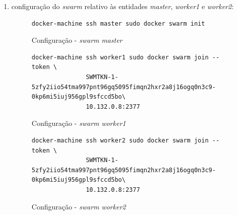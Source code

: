 \documentclass[a4paper]{report}
\begin{document}
{\begin{enumerate}[label=\textbf{\arabic*.}]
            \item configuração do \textit{swarm} relativo às entidades \textsl{master}, \textsl{worker1} e \textsl{worker2}:
            \begin{figure}[H]
                \centering
                \begin{verbatim}
docker-machine ssh master sudo docker swarm init
                \end{verbatim}
                \caption{Configuração - \textit{swarm} \textsl{master}}
                \label{fig:4}
            \end{figure}

            \begin{figure}[H]
                \centering
                \begin{verbatim}
docker-machine ssh worker1 sudo docker swarm join --token \
               SWMTKN-1-5zfy2iio54tma997pnt96gq5095fimqn2hxr2a8j16ogq0n3c9-0kp6mi5iuj956gpl9sfccd5bo\
               10.132.0.8:2377
                \end{verbatim}
                \caption{Configuração - \textit{swarm} \textsl{worker1}}
                \label{fig:5}
            \end{figure}

            \begin{figure}[H]
                \centering
                \begin{verbatim}
docker-machine ssh worker2 sudo docker swarm join --token \
               SWMTKN-1-5zfy2iio54tma997pnt96gq5095fimqn2hxr2a8j16ogq0n3c9-0kp6mi5iuj956gpl9sfccd5bo\
               10.132.0.8:2377
                \end{verbatim}
                \caption{Configuração - \textit{swarm} \textsl{worker2}}
                \label{fig:6}
            \end{figure}


\end{enumerate}}
\end{document}
